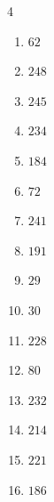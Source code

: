 \begin{multicols}{4}
\begin{enumerate}
  \item $62$


  \item $248$


  \item $245$


  \item $234$


  \item $184$


  \item $72$


  \item $241$


  \item $191$


  \item $29$


  \item $30$


  \item $228$


  \item $80$


  \item $232$


  \item $214$


  \item $221$


\columnbreak %

  \item $186$


\end{enumerate}
\end{multicols}
